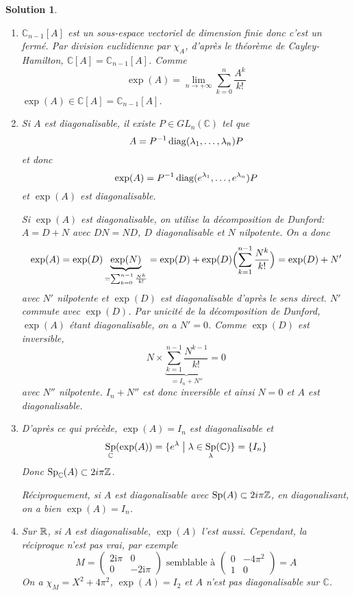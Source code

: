 \documentclass[12pt]{article}
\newtheorem{solution}{Solution}[section]
\theoremstyle{remark}
\newcommand{\C}{\mathbb{C}} \newcommand{\Q}{\mathbb{Q}}
\DeclareMathOperator{\Sp}{Sp} \DeclareMathOperator{\mat}{mat}
\numberwithin{equation}{section}
\begin{document}
\begin{solution}
	\phantom{}
	\begin{enumerate}
		\item $\C_{n-1}[A]$ est un sous-espace vectoriel de dimension finie donc c'est un fermé. Par division euclidienne par $\chi_{A}$, d'après le théorème de Cayley-Hamilton, $\C[A]=\C_{n-1}[A]$. Comme 
		$$\exp(A)=\lim\limits_{n\to+\infty}\sum_{k=0}^{n}\frac{A^{k}}{k!}$$
		$\exp(A)\in \C[A]=\C_{n-1}[A]$.

		\item Si $A$ est diagonalisable, il existe $P\in GL_{n}(\C)$ tel que 
		$$A=P^{-1}\operatorname{diag}(\lambda_{1},\dots,\lambda_{n})P$$
		et donc 
		$$\exp(A)=P^{-1}\operatorname{diag}(e^{\lambda_{1}},\dots,e^{\lambda_{n}})P$$
		et $\exp(A)$ est diagonalisable.

		Si $\exp(A)$ est diagonalisable, on utilise la décomposition de Dunford: $A=D+N$ avec $DN=ND$, $D$ diagonalisable et $N$ nilpotente. On a donc 
		$$\exp(A)=\exp(D)\underbrace{\exp(N)}_{=\sum_{k=0}^{n-1}\frac{N^{k}}{k!}}=\exp(D)+\exp(D)\Bigl(\sum_{k=1}^{n-1}\frac{N^{k}}{k!}\Bigr)=\exp(D)+N'$$
		avec $N'$ nilpotente et $\exp(D)$ est diagonalisable d'après le sens direct. $N'$ commute avec $\exp(D)$. Par unicité de la décomposition de Dunford, $\exp(A)$ étant diagonalisable, on a $N'=0$. Comme $\exp(D)$ est inversible, 
		$$N\times\underbrace{\sum_{k=1}^{n-1}\frac{N^{k-1}}{k!}}_{=I_{n}+N''}=0$$
		avec $N''$ nilpotente. $I_{n}+N''$ est donc inversible et ainsi $N=0$ et $A$ est diagonalisable.

		\item D'après ce qui précède, $\exp(A)=I_{n}$ est diagonalisable et 
		$$\Sp_{\C}(\exp(A))=\{e^{\lambda}\bigm|\lambda\in\Sp_{\lambda}(\C)\}=\{I_{n}\}$$
		Donc $\Sp_{\C}(A)\subset 2i\pi\Z$.

		Réciproquement, si $A$ est diagonalisable avec $\Sp(A)\subset 2i\pi\Z$, en diagonalisant, on a bien $\exp(A)=I_{n}$.

		\item Sur $\mathbb{R}$, si $A$ est diagonalisable, $\exp(A)$ l'est aussi. Cependant, la réciproque n'est pas vrai, par exemple
		$$M=\begin{pmatrix}
			2\mathrm{i}\pi & 0\\
			0 & -2\mathrm{i}\pi
		\end{pmatrix}\text{  semblable à }
		\begin{pmatrix}
			0 & -4\pi^{2}\\
			1 & 0
		\end{pmatrix}=A$$
		On a $\chi_{M}=X^{2}+4\pi^{2}$, $\exp(A)=I_{2}$ et $A$ n'est pas diagonalisable sur $\C$.
	\end{enumerate}
\end{solution}
\end{document}
